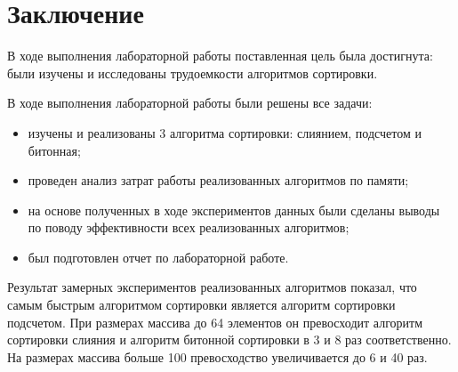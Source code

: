 \chapter*{Заключение}

В ходе выполнения лабораторной работы поставленная цель была достигнута: были изучены и исследованы трудоемкости алгоритмов сортировки.

В ходе выполнения лабораторной работы были решены все задачи:
\begin{itemize}
	\item изучены и реализованы 3 алгоритма сортировки: слиянием, подсчетом и битонная;
	\item проведен анализ затрат работы реализованных алгоритмов по памяти;
	\item на основе полученных в ходе экспериментов данных были сделаны выводы по поводу эффективности всех реализованных алгоритмов;
	\item был подготовлен отчет по лабораторной работе.
\end{itemize}

Результат замерных экспериментов реализованных алгоритмов показал, что самым быстрым алгоритмом сортировки является алгоритм сортировки подсчетом. При размерах массива до 64 элементов он превосходит алгоритм сортировки слияния и алгоритм битонной сортировки в 3 и 8 раз соответственно. На размерах массива больше 100 превосходство увеличивается до 6 и 40 раз.
